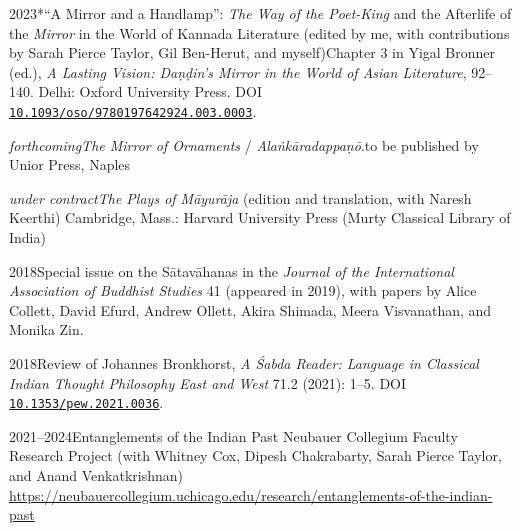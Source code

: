 \documentclass{scrartcl}
\begin{document}
\begin{entrylist}
{2023}{*“A Mirror and a Handlamp”: \emph{The Way of the Poet-King} and the Afterlife of the \emph{Mirror} in the World of Kannada Literature (edited by me, with contributions by Sarah Pierce Taylor, Gil Ben-Herut, and myself)}{Chapter 3 in Yigal Bronner (ed.), \emph{A Lasting Vision: Daṇḍin’s Mirror in the World of Asian Literature}, 92–140. Delhi: Oxford University Press. DOI \href{https://doi.org/10.1093/oso/9780197642924.003.0003}{\texttt{10.1093/oso/9780197642924.003.0003}}.}
\end{entrylist}\bigskip

\begin{entrylist}
{\emph{forthcoming}}{\emph{The Mirror of Ornaments} / \emph{Alaṅkāradappaṇō}.}{to be published by Unior Press, Naples}
\end{entrylist}

\begin{entrylist}
{\emph{under contract}}{\emph{The Plays of Māyurāja} (edition and translation, with Naresh Keerthi)}
{Cambridge, Mass.: Harvard University Press (Murty Classical Library of India)}
\end{entrylist}

\sectionline

\begin{entrylist}
\singleentry
{2018}{Special issue on the Sātavāhanas in the \emph{Journal of the International Association of Buddhist Studies} 41 (appeared in 2019), with papers by Alice Collett, David Efurd, Andrew Ollett, Akira Shimada, Meera Visvanathan, and Monika Zin.}
\end{entrylist}

\begin{entrylist}
{2018}{Review of Johannes Bronkhorst, \emph{A Śabda Reader: Language in Classical Indian Thought}}
{\emph{Philosophy East and West} 71.2 (2021): 1–5. DOI \href{https://doi.org/10.1353/pew.2021.0036}{\texttt{10.1353/pew.2021.0036}}.}
\end{entrylist}

\sectionline


\begin{entrylist}
{2021–2024}{Entanglements of the Indian Past}
{Neubauer Collegium Faculty Research Project (with Whitney Cox, Dipesh Chakrabarty, Sarah Pierce Taylor, and Anand Venkatkrishnan)\\
\url{https://neubauercollegium.uchicago.edu/research/entanglements-of-the-indian-past}}
\end{entrylist} 
\end{document}
